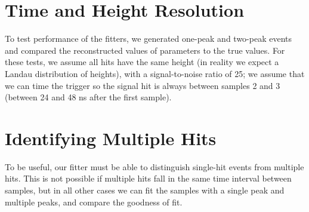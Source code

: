 \section{Time and Height Resolution}
To test performance of the fitters, we generated one-peak and two-peak events and compared the reconstructed values of parameters to the true values. 
For these tests, we assume all hits have the same height (in reality we expect a Landau distribution of heights), with a signal-to-noise ratio of 25; we assume that we can time the trigger so the signal hit is always between samples 2 and 3 (between 24 and 48 ns after the first sample).


\section{Identifying Multiple Hits}
To be useful, our fitter must be able to distinguish single-hit events from multiple hits. 
This is not possible if multiple hits fall in the same time interval between samples, but in all other cases we can fit the samples with a single peak and multiple peaks, and compare the goodness of fit.
